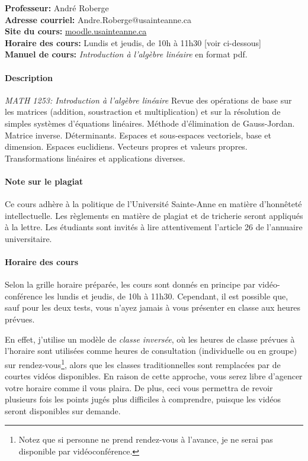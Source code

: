 \documentclass[11pt]{article}
\begin{document}
\noindent\textbf{Professeur: } André Roberge \\
\textbf{Adresse courriel: } Andre.Roberge@usainteanne.ca\\
\textbf{Site du cours: } \url{moodle.usainteanne.ca} \\
\textbf{Horaire des cours:} Lundis et jeudis, de 10h à 11h30 {\tiny [voir ci-dessous]} \\
\textbf{Manuel de cours:} \textit{Introduction à l'algèbre linéaire} en format pdf.

\paragraph*{Description} 

{\small
\textit{MATH 1253: Introduction à l'algèbre linéaire}
Revue des opérations de base sur les matrices (addition, soustraction et multiplication) et sur la résolution de simples systèmes d'équations linéaires.  Méthode d'élimination de Gauss-Jordan.  Matrice inverse. Déterminants. Espaces et sous-espaces vectoriels, base et dimension.  Espaces euclidiens. Vecteurs propres et valeurs propres.  Transformations linéaires et applications diverses.
}

\paragraph*{Note sur le plagiat} Ce cours adhère à la politique de l'Université
Sainte-Anne en matière d'honnêteté intellectuelle.
Les règlements en matière de plagiat et de tricherie seront appliqués à la lettre.
Les étudiants sont invités à lire attentivement l'article 26 de l'annuaire universitaire.

\paragraph*{Horaire des cours} Selon la grille horaire préparée, les cours sont donnés en principe 
par vidéo-conférence les lundis et jeudis, de 10h à 11h30.  
Cependant, il est possible que, sauf pour
les deux tests, vous n'ayez jamais à vous présenter en classe aux heures prévues.

En effet, j'utilise un modèle de \textit{classe inversée}, où les heures de classe prévues à l'horaire sont utilisées comme heures de consultation (individuelle ou en groupe) sur rendez-vous\footnote{Notez que si personne ne prend rendez-vous à l'avance, je ne serai pas disponible par vidéoconférence.
}, alors
que les classes traditionnelles sont remplacées par de courtes vidéos disponibles.
   En raison de cette approche,
vous serez libre d'agencer votre horaire comme il vous plaira.  
De plus, ceci vous permettra de revoir
plusieurs fois les points jugés plus difficiles à comprendre, puisque les vidéos seront disponibles sur demande.
\end{document}
